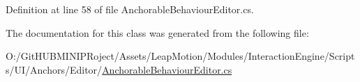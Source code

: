 Definition at line 58 of file Anchorable\+Behaviour\+Editor.\+cs.



The documentation for this class was generated from the following file\+:\begin{DoxyCompactItemize}
\item 
O\+:/\+Git\+H\+U\+B\+M\+I\+N\+I\+P\+Roject/\+Assets/\+Leap\+Motion/\+Modules/\+Interaction\+Engine/\+Scripts/\+U\+I/\+Anchors/\+Editor/\mbox{\hyperlink{_anchorable_behaviour_editor_8cs}{Anchorable\+Behaviour\+Editor.\+cs}}\end{DoxyCompactItemize}
